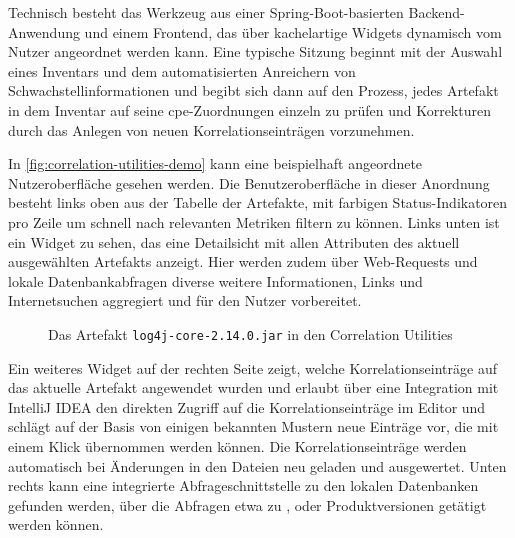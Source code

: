 Technisch besteht das Werkzeug aus einer Spring-Boot-basierten Backend-Anwendung und einem Frontend, das über kachelartige Widgets dynamisch vom Nutzer angeordnet werden kann.
Eine typische Sitzung beginnt mit der Auswahl eines Inventars und dem automatisierten Anreichern von Schwachstellinformationen und begibt sich dann auf den Prozess, jedes Artefakt in dem Inventar auf seine \acrshort{cpe}-Zuordnungen einzeln zu prüfen und Korrekturen durch das Anlegen von neuen Korrelationseinträgen vorzunehmen.

In \autoref{fig:correlation-utilities-demo} kann eine beispielhaft angeordnete Nutzeroberfläche gesehen werden.
Die Benutzeroberfläche in dieser Anordnung besteht links oben aus der Tabelle der Artefakte, mit farbigen Status-Indikatoren pro Zeile um schnell nach relevanten Metriken filtern zu können.
Links unten ist ein Widget zu sehen, das eine Detailsicht mit allen Attributen des aktuell ausgewählten Artefakts anzeigt.
Hier werden zudem über Web-Requests und lokale Datenbankabfragen diverse weitere Informationen, Links und Internetsuchen aggregiert und für den Nutzer vorbereitet.

\begin{figure}
    \centering
    \caption{Das Artefakt \texttt{log4j-core-2.14.0.jar} in den Correlation Utilities}
    \label{fig:correlation-utilities-demo}
\end{figure}

Ein weiteres Widget auf der rechten Seite zeigt, welche Korrelationseinträge auf das aktuelle Artefakt angewendet wurden und erlaubt über eine Integration mit IntelliJ IDEA den direkten Zugriff auf die Korrelationseinträge im Editor und schlägt auf der Basis von einigen bekannten Mustern neue Einträge vor, die mit einem Klick übernommen werden können.
Die Korrelationseinträge werden automatisch bei Änderungen in den Dateien neu geladen und ausgewertet.
Unten rechts kann eine integrierte Abfrageschnittstelle zu den lokalen Datenbanken gefunden werden, über die Abfragen etwa zu ,  oder Produktversionen getätigt werden können.

